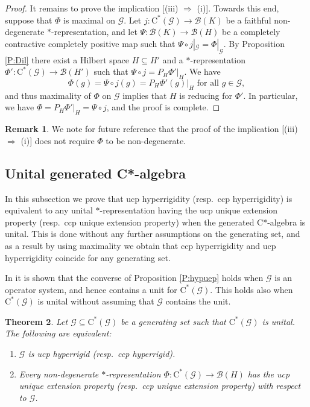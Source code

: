 \documentclass[11pt, draft]{amsart}
\numberwithin{equation}{section}
\theoremstyle{plain}
\newtheorem{theorem}{Theorem}[section]
\theoremstyle{definition}
\newtheorem{remark}[theorem]{Remark}
\theoremstyle{remark}
\newcommand{\B}{{\mathcal{B}}}
\newcommand{\G}{{\mathcal{G}}}
\newcommand{\foral}{\text{ for all }}
\newcommand{\ca}{\mathrm{C}^*}
\begin{document}
\begin{proof}
\smallskip

It remains to prove the implication [(iii) $\Rightarrow$ (i)].
Towards this end, suppose that $\Phi$ is maximal on $\G$.
Let $j\colon \ca(\G)\to \B(K)$ be a faithful non-degenerate $*$-representation, and let $\Psi\colon \B(K)\to \B(H)$ be a completely contractive completely positive map such that $\Psi\circ j|_{\G}=\Phi|_{\G}$. 
By Proposition \ref{P:Dil} there exist a Hilbert space $H\subseteq H'$ and a $*$-representation $\Phi'\colon \ca(\G)\to \B(H')$ such that $\Psi\circ j = P_H\Phi' |_H$.
We have 
\[
\Phi(g)=\Psi\circ j(g)=P_H \Phi'(g)|_H \foral g\in \G,
\]
and thus maximality of $\Phi$ on $\G$ implies that $H$ is reducing for $\Phi'$.
In particular, we have $\Phi = P_H \Phi' |_H = \Psi\circ j$, and the proof is complete.
\end{proof}

\begin{remark}\label{R:uepiffmax}
We note for future reference that the proof of the implication [(iii) $\Rightarrow$ (i)] does not require $\Phi$ to be non-degenerate.
\end{remark}

\subsection{Unital generated C*-algebra}

In this subsection we prove that ucp hyperrigidity (resp.\ ccp hyperrigidity) is equivalent to any unital $*$-representation having the ucp unique extension property (resp.\ ccp unique extension property) when the generated C*-algebra is unital. 
This is done without any further assumptions on the generating set, and as a result by using maximality we obtain that ccp hyperrigidity and ucp hyperrigidity coincide for any generating set.

In \cite[Theorem 2.1]{Arv11} it is shown that the converse of Proposition \ref{P:hypuep} holds when $\G$ is an operator system, and hence contains a unit for $\ca(\G)$.
This holds also when $\ca(\G)$ is unital without assuming that $\G$ contains the unit.

\begin{theorem}\label{T:hypiffuepun}
Let $\G \subseteq \ca(\G)$ be a generating set such that  $\ca(\G)$ is unital.
The following are equivalent:
\begin{enumerate}
\item $\G$ is ucp hyperrigid (resp.\ ccp hyperrigid).
\item Every non-degenerate $*$-representation $\Phi \colon \ca(\G) \to \B(H)$ has the ucp unique extension property  (resp.\ ccp unique extension property) with respect to $\G$. 
\end{enumerate}
\end{theorem}
\end{document}
